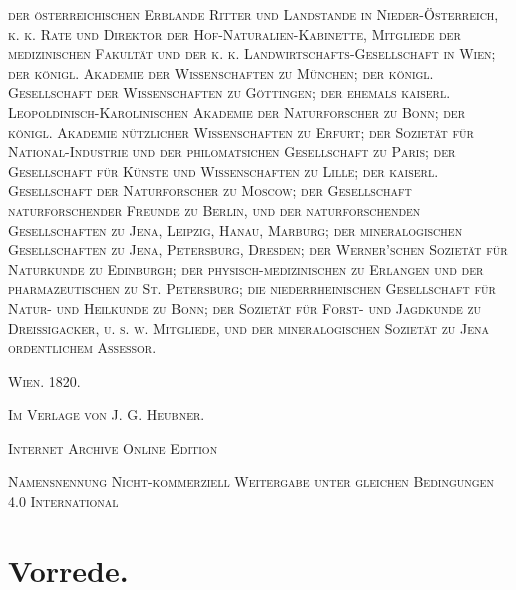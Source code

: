 \documentclass[a4paper, 11pt, oneside, german]{article}
\begin{document}
\begin{titlepage}
    {\scshape\footnotesize der österreichischen Erblande Ritter und Landstande in Nieder-Österreich, k. k. Rate und Direktor der Hof-Naturalien-Kabinette, Mitgliede der medizinischen Fakultät und der k. k. Landwirtschafts-Gesellschaft in Wien; der königl. Akademie der Wissenschaften zu München; der königl. Gesellschaft der Wissenschaften zu Göttingen; der ehemals kaiserl. Leopoldinisch-Karolinischen Akademie der Naturforscher zu Bonn; der königl. Akademie nützlicher Wissenschaften zu Erfurt; der Sozietät für National-Industrie und der philomatsichen Gesellschaft zu Paris; der Gesellschaft für Künste und Wissenschaften zu Lille; der kaiserl. Gesellschaft der Naturforscher zu Moscow; der Gesellschaft naturforschender Freunde zu Berlin, und der naturforschenden Gesellschaften zu Jena, Leipzig, Hanau, Marburg; der mineralogischen Gesellschaften zu Jena, Petersburg, Dresden; der Werner'schen Sozietät für Naturkunde zu Edinburgh; der physisch-medizinischen zu Erlangen und der pharmazeutischen zu St. Petersburg; die niederrheinischen Gesellschaft für Natur- und Heilkunde zu Bonn; der Sozietät für Forst- und Jagdkunde zu Dreissigacker, u. s. w. Mitgliede, und der mineralogischen Sozietät zu Jena ordentlichem Assessor.} %
    
    \vspace*{\fill}

	\vspace{1\baselineskip}

	{\small\scshape Wien. 1820.}
	
	{\small\scshape{Im Verlage von J. G. Heubner.}}
	
	\vspace{0.5\baselineskip} %

    \scshape Internet Archive Online Edition  %
	
	{\scshape\small Namensnennung Nicht-kommerziell Weitergabe unter gleichen Bedingungen 4.0 International} %
\end{titlepage}
\setlength{\parskip}{1mm plus1mm minus1mm}
\clearpage
\tableofcontents
\clearpage
\section*{Vorrede.}
\end{document}
